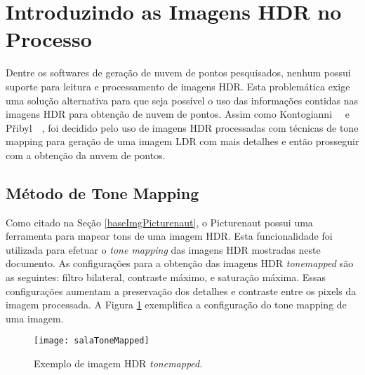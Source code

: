 \section{Introduzindo as Imagens HDR no Processo} \label{pontosProcesso}

Dentre os softwares de geração de nuvem de pontos pesquisados, nenhum possui suporte para leitura e processamento de imagens HDR. Esta problemática exige uma solução alternativa para que seja possível o uso das informações contidas nas imagens HDR para obtenção de nuvem de pontos. Assim como Kontogianni~\etal~\cite{hdr3d} e P\v{r}ibyl~\etal~\cite{hdr3d2}, foi decidido pelo uso de imagens HDR processadas com técnicas de tone mapping para geração de uma imagem LDR com mais detalhes e então prosseguir com a obtenção da nuvem de pontos.

\subsection{Método de Tone Mapping} \label{pontosToneMapping}

Como citado na Seção \ref{baseImgPicturenaut}, o Picturenaut possui uma ferramenta para mapear tons de uma imagem HDR. Esta funcionalidade foi utilizada para efetuar o \textit{tone mapping} das imagens HDR mostradas neste documento. As configurações para a obtenção das imagens HDR \textit{tonemapped} são as seguintes: filtro bilateral, contraste máximo, e saturação máxima. Essas configurações aumentam a preservação dos detalhes e contraste entre os pixels da imagem processada. A Figura \ref{figPontosToneMapping} exemplifica a configuração do tone mapping de uma imagem.

\begin{figure}[H]
  \centering
  \texttt{[image: salaToneMapped]}
  \caption{Exemplo de imagem HDR \textit{tonemapped}.}
  \label{figPontosToneMapping}
\end{figure}
